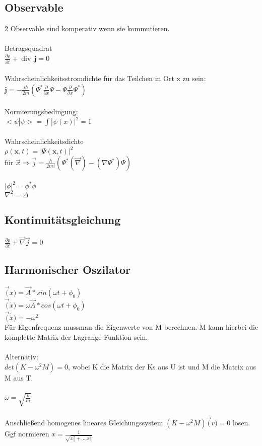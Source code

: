 \documentclass[10pt,a4paper]{article}
\begin{document}
\subsection{Observable}
2 Observable sind komperativ wenn sie kommutieren.\\
%
\\
Betragsquadrat\\
$ \frac{\partial \rho}{\partial t} + \operatorname{div} \, \mathbf{j} = 0$\\
%
\\
Wahrscheinlichkeitsstromdichte für das Teilchen in Ort x zu sein:\\
$ \mathbf j = -\frac{i \hbar}{2m}(\Psi^*\frac{\partial}{\partial x}\Psi - \Psi\frac{\partial}{\partial x}\Psi^*)$\\
%
\\
Normierungsbedingung:\\
$<\psi|\psi>=\int |\psi(x)|^2=1$\\
%
\\
Wahrscheinlichkeitsdichte\\
$\rho(\mathbf x,t)=|\Psi(\mathbf x,t)|^2$\\
für $\vec{x} \Rightarrow \vec{j}=\frac{\hbar}{2mi}(\Psi^* (\vec{\nabla})-(\nabla \Psi^*)\Psi)$\\
%
\\
$|\phi|^2=\phi^*\phi$\\
$\nabla^2=\Delta$

\subsection{Kontinuitätsgleichung}
$\frac{\partial p}{\partial t} + \vec{\nabla}\vec{j}=0$

\subsection{Harmonischer Oszilator}
$\vec(x)=\vec{A}*sin(\omega t + \phi_0)$\\
$\vec(\dot{x})=\omega\vec{A}*cos(\omega t + \phi_0)$\\
$\vec(\dot{\dot{x}})=-\omega^2$\\
%
Für Eigenfrequenz mussman die Eigenwerte von M berechnen. M kann hierbei die komplette Matrix der Lagrange Funktion sein.\\
%
\\
Alternativ:\\
$det(K-\omega^2M)=0$, wobei K die Matrix der Ks aus U ist und M die Matrix aus M aus T.\\
%
\\
$\omega=\sqrt{\frac{k}{m}}$\\
%
\\
Anschließend homogenes lineares Gleichungssystem $(K-\omega^2M)\vec(v)=0$ lösen. Ggf normieren $x=\frac{1}{\sqrt{x^2_1+....x^2_n}}$\\
%
\end{document}
